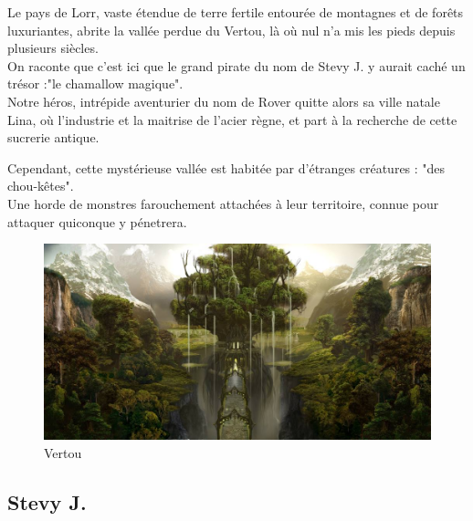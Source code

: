 \documentclass[a4paper 12pts]{article}
\begin{document}
\vspace{1cm}

Le pays de Lorr, vaste étendue de terre fertile entourée de montagnes et de forêts luxuriantes, abrite la vallée perdue du Vertou, 
là où nul n'a mis les pieds depuis plusieurs siècles.\\
On raconte que c'est ici que le grand pirate du nom de Stevy J. y aurait caché un trésor :"le chamallow magique".\\
Notre héros, intrépide aventurier du nom de Rover quitte alors sa ville natale Lina, où l'industrie et la maitrise de l'acier règne, et part à la recherche de cette sucrerie antique.\\

\newpage

Cependant, cette mystérieuse vallée est habitée par d'étranges créatures : "des chou-kêtes".\\
Une horde de monstres farouchement attachées à leur territoire, connue pour attaquer quiconque y pénetrera.\\

\vspace{1cm}

\begin{figure}[h]
	\includegraphics[width=350pt]{Illustration/Vertou.jpg}
	\caption{Vertou}
\end{figure}



\vspace{1cm}


\newpage
\subsection{Stevy J.}

\vspace{1cm}
\end{document}
